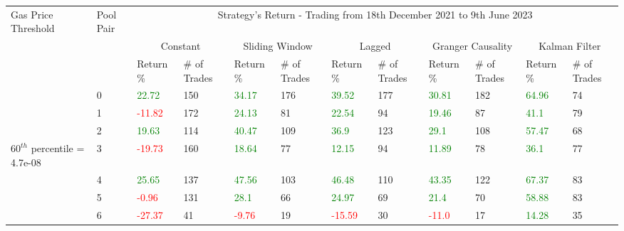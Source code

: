 \begin{table}[htb!]
    \centering
    \begin{adjustwidth}{-0.9in}{-0.9in}
        \begin{tabular}{|p{5em}|p{2em}|p{3em}|p{3em}|p{3em}|p{3em}|p{3em}|p{3em}|p{3em}|p{3em}|p{3em}|p{3em}|}\hline
            Gas Price Threshold & Pool Pair & \multicolumn{10}{|c|}{Strategy's Return - Trading from 18th December 2021 to 9th June 2023} \\\cline{3-12}
            &   & \multicolumn{2}{|c|}{Constant} & \multicolumn{2}{|c|}{Sliding Window} & \multicolumn{2}{|c|}{Lagged} & \multicolumn{2}{|c|}{Granger Causality} & \multicolumn{2}{|c|}{Kalman Filter}\\\cline{3-12}
            & & Return \% & \# of Trades & Return \% & \# of Trades & Return \% & \# of Trades & Return \% & \# of Trades & Return \% & \# of Trades\\\hline
            
            & 0 & \textcolor{green}{22.72} & 150 & \textcolor{green}{34.17} & 176 & \textcolor{green}{39.52} & 177 & \textcolor{green}{30.81} & 182 & \textcolor{green}{64.96} & 74\\\cline{3-12}
            & 1 & \textcolor{red}{-11.82} & 172 & \textcolor{green}{24.13} & 81 & \textcolor{green}{22.54} & 94 & \textcolor{green}{19.46} & 87 & \textcolor{green}{41.1} & 79\\\cline{3-12}
            & 2 & \textcolor{green}{19.63} & 114 & \textcolor{green}{40.47} & 109 & \textcolor{green}{36.9} & 123 & \textcolor{green}{29.1} & 108 & \textcolor{green}{57.47} & 68\\\cline{3-12}
            $60^{th}$ percentile = 4.7e-08 & 3 & \textcolor{red}{-19.73} & 160 & \textcolor{green}{18.64} & 77 & \textcolor{green}{12.15} & 94 & \textcolor{green}{11.89} & 78 & \textcolor{green}{36.1} & 77\\[-5.5ex]\cline{3-12}
            & 4 & \textcolor{green}{25.65} & 137 & \textcolor{green}{47.56} & 103 & \textcolor{green}{46.48} & 110 & \textcolor{green}{43.35} & 122 & \textcolor{green}{67.37} & 83\\\cline{3-12}
            & 5 & \textcolor{red}{-0.96} & 131 & \textcolor{green}{28.1} & 66 & \textcolor{green}{24.97} & 69 & \textcolor{green}{21.4} & 70 & \textcolor{green}{58.88} & 83\\\cline{3-12}
            & 6 & \textcolor{red}{-27.37} & 41 & \textcolor{red}{-9.76} & 19 & \textcolor{red}{-15.59} & 30 & \textcolor{red}{-11.0} & 17 & \textcolor{green}{14.28} & 35\\\hline\hline


\end{tabular}
\end{adjustwidth}
\end{table}
